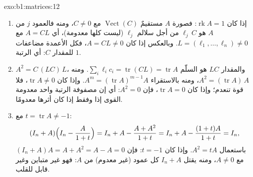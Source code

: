 \begin{solution}{exo:b1:matrices:12}
\begin{enumerate}
  \item إذا كان $\operatorname{rk} A = 1$: فصورة $A$ مستقيمٌ
        $\operatorname{Vect}(C)$ مع $C \neq 0$، ومنه فالعمود $j$
        من $A$ هو $\ell_j\,C$ من أجل سلالم $\ell_j$ (ليست
        كلها معدومة)، أي $A = C L$ مع $L = (\ell_1, \dots,
        \ell_n) \neq 0$. وبالعكس إذا كان $A = CL \neq 0$، فكل
        الأعمدة مضاعفات للمقدار $C$: أي الرتبة $1$.
  \item $A^2 = C\,(L C)\,L$، والمقدار $LC$ هو السلّم $\sum_i
        \ell_i c_i = \operatorname{tr}(CL) = \operatorname{tr}
        A$. ومنه $A^2 = (\operatorname{tr} A)\,A$، ومنه بالاستقراء $A^m = (\operatorname{tr} A)^{m-1} A$. وإذا كان
        $\operatorname{tr} A \neq 0$، فلا قوة تنعدم؛ وإذا كان
        $\operatorname{tr} A = 0$، فإن $A^2 = 0$: أي إن مصفوفة
        الرتبة واحد معدومة القوى إذا وفقط إذا كان أثرها معدومًا.
  \item مع $t = \operatorname{tr} A \neq -1$:
        \[
        (I_n + A)\Bigl(I_n - \frac{A}{1 + t}\Bigr)
        = I_n + A - \frac{A + A^2}{1 + t}
        = I_n + A - \frac{(1 + t)A}{1 + t} = I_n ,
        \]
        باستعمال $A^2 = tA$. وإذا كان $t = -1$: فإن $(I_n + A)A = A + A^2 = A
        - A = 0$ مع $A \neq 0$، ومنه يقتل $I_n + A$ كل
        عمود (غير معدوم) من $A$: فهو غير متباين وغير قابل للقلب.
\end{enumerate}
\end{solution}

